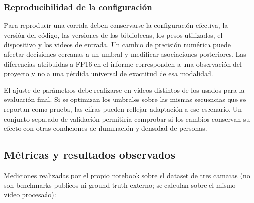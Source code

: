 \documentclass[12pt,letterpaper]{article}
\begin{document}
\subsubsection{Reproducibilidad de la configuración}
Para reproducir una corrida deben conservarse la configuración efectiva, la versión del código, las versiones de las bibliotecas, los pesos utilizados, el dispositivo y los videos de entrada. Un cambio de precisión numérica puede afectar decisiones cercanas a un umbral y modificar asociaciones posteriores. Las diferencias atribuidas a FP16 en el informe corresponden a una observación del proyecto y no a una pérdida universal de exactitud de esa modalidad.

El ajuste de parámetros debe realizarse en videos distintos de los usados para la evaluación final. Si se optimizan los umbrales sobre las mismas secuencias que se reportan como prueba, las cifras pueden reflejar adaptación a ese escenario. Un conjunto separado de validación permitiría comprobar si los cambios conservan su efecto con otras condiciones de iluminación y densidad de personas.


\subsection{Métricas y resultados observados}

Mediciones realizadas por el propio notebook sobre el dataset de tres camaras (no son benchmarks publicos ni ground truth externo; se calculan sobre el mismo video procesado):
\end{document}
